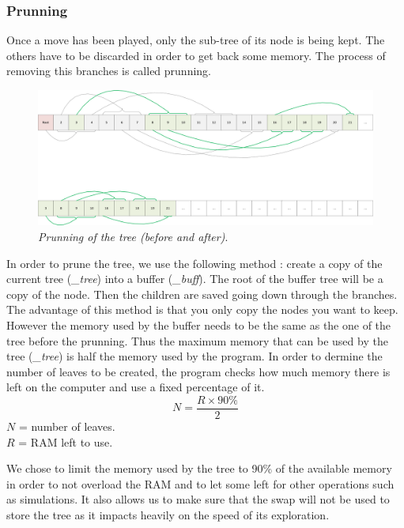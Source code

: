 \subsubsection{Prunning}
Once a move has been played, only the sub-tree of its node is being kept. The others have to be discarded in order to get back some memory. The process of removing this branches is called prunning.
\begin{figure}[H] 
\centerline{\includegraphics[width=\textwidth]{Data_Structure/Img/array.png}}
\caption{\label{fig:arrayprunning}\textit{Prunning of the tree (before and after)}.}
\end{figure}
In order to prune the tree, we use the following method : create a copy of the current tree (\textit{\_tree}) into a buffer (\textit{\_buff}). The root of the buffer tree will be a copy of the node. Then the children are saved going down through the branches. The advantage of this method is that you only copy the nodes you want to keep. However the memory used by the buffer needs to be the same as the one of the tree before the prunning. Thus the maximum memory that can be used by the tree (\textit{\_tree}) is half the memory used by the program. In order to dermine the number of leaves to be created, the program checks how much memory there is left on the computer and use a fixed percentage of it.
\begin{equation}
N = \frac{R \times 90\%}{2}
\end{equation}
\ensuremath{N} = number of leaves.\\
\ensuremath{R} = RAM left to use.

We chose to limit the memory used by the tree to 90\% of the available memory in order to not overload the RAM and to let some left for other operations such as simulations. It also allows us to make sure that the swap will not be used to store the tree as it impacts heavily on the speed of its exploration.

